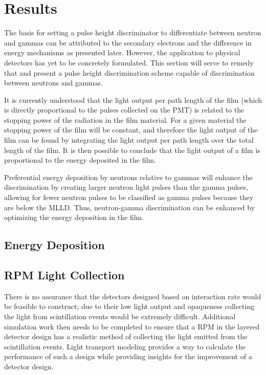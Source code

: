 \chapter{Results}
\label{chap:Results}

The basis for setting a pulse height discriminator to differentiate between neutron and gammas can be attributed to the secondary electrons and the difference in energy mechanisms as presented later.
However, the application to physical detectors has yet to be concretely formulated.
This section will serve to remedy that and present a pulse height discrimination scheme capable of discrimination between neutrons and gammas.

It is currently understood that the light output per path length of the film (which is directly proportional to the pulses collected on the PMT) is related to the stopping power of the radiation in the film material.
For a given material the stopping power of the film will be constant, and therefore the light output of the film can be found by integrating the light output per path length over the total length of the film.
It is then possible to conclude that the light output of a film is proportional to the energy deposited in the film.

Preferential energy deposition by neutrons relative to gammas will enhance the discrimination by creating larger neutron light pulses than the gamma pulses, allowing for fewer neutron pulses to be classified as gamma pulses because they are below the MLLD.
Thus, neutron-gamma discrimination can be enhanced by optimizing the energy deposition in the film. 

\section{Energy Deposition}


\section{RPM Light Collection}
There is no assurance that the detectors designed based on interaction rate would be feasible to construct; due to their low light output and opaqueness collecting the light from scintillation events would be extremely difficult.  
Additional simulation work then needs to be completed to ensure that a RPM in the layered detector design has a realistic method of collecting the light emitted from the scintillation events.
Light transport modeling provides a way to calculate the performance of such a design while providing insights for the improvement of a detector design.


